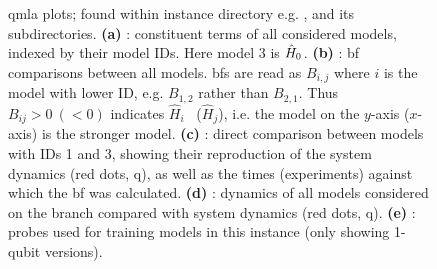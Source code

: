 \begin{figure}[H]
\begin{center}
{            \label{fig:qmla_bayes_factor_comparison}
        }
        \qquad
        \qquad
    \end{center}
    \caption[Instance plots]{
        \gls{qmla} plots; found within instance directory e.g. , 
        and its subdirectories. 
        \textbf{(a)} : constituent terms of all considered models, indexed by their model IDs.
        Here model 3 is $\hat{H}_0$. 
        \textbf{(b)} : \acrfull{bf} comparisons between all models. 
        \glspl{bf} are read as $B_{i,j}$ where $i$ is the model with lower ID, 
            e.g. $B_{1,2}$ rather than $B_{2,1}$. 
            Thus $B_{ij} > 0 \ (<0)$ indicates $\hat{H}_i$ \ ($\hat{H}_j$), i.e. the model on the $y$-axis ($x$-axis) 
            is the stronger model.
        \textbf{(c)} : direct comparison between models with IDs 1 and 3, 
            showing their reproduction of the system dynamics (red dots, \gls{q}), 
            as well as the times (experiments) against which the \gls{bf} was calculated. 
        \textbf{(d)} : dynamics of all models considered on the branch
        compared with system dynamics (red dots, \gls{q}). 
        \textbf{(e)} : probes used for training models in this \gls{instance} (only showing 1-qubit versions).
    }
    \label{fig:instance_plots}
\end{figure}

